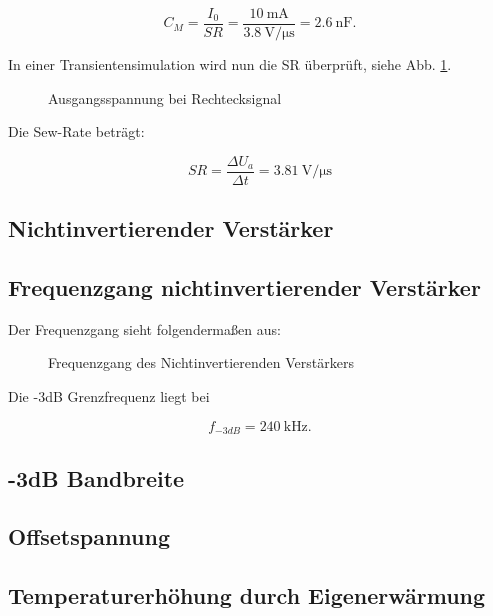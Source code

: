 \begin{equation}
    C_M = \frac{I_0}{SR} = \frac{\SI{10}{\milli\ampere}}{\SI{3,8}{\volt\per\micro\second}} = \SI{2.6}{\nano\farad} .
\end{equation}

In einer Transientensimulation wird nun die SR überprüft, siehe Abb. \ref{fig_Kap5_21:SR}.

\begin{figure}[H]
	\centering \small
	\scalebox{0.9}{}
	\caption{Ausgangsspannung bei Rechtecksignal}
	\label{fig_Kap5_21:SR}
\end{figure}

Die Sew-Rate beträgt:

\begin{equation}
    SR = \frac{\Delta U_a}{\Delta t} = \SI{3.81}{\volt\per\micro\second}
\end{equation}

\subsection{Nichtinvertierender Verstärker}



\subsection{Frequenzgang nichtinvertierender Verstärker}
Der Frequenzgang sieht folgendermaßen aus:

\begin{figure}[H]
	\centering \small
	\scalebox{0.9}{}
	\caption{Frequenzgang des Nichtinvertierenden Verstärkers}
	\label{fig_Kap5_22:Mag}
\end{figure}

Die -3dB Grenzfrequenz liegt bei

\begin{equation}
    f_{-3dB} = \SI{240}{\kilo\hertz} .
\end{equation}

\subsection{-3dB Bandbreite}

\subsection{Offsetspannung}

\subsection{Temperaturerhöhung durch Eigenerwärmung}

